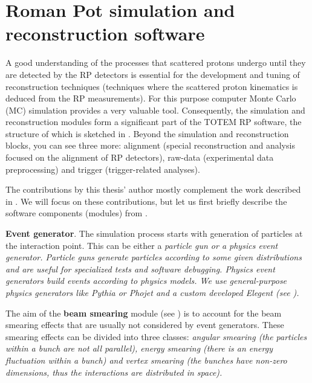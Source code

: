 \iffalse
RP, MC, IP5, CMS, T1, T2, VFAT, DIGI, RECO, LAB, LHC, LS, DPE, MC, TOTEM, RMS, ndf
\fi


\chapter[sr]{Roman Pot simulation and reconstruction software}



A good understanding of the processes that scattered protons undergo until they are detected by the RP detectors is essential for the development and tuning of reconstruction techniques (techniques where the scattered proton kinematics is deduced from the RP measurements). For this purpose computer Monte Carlo (MC) simulation provides a very valuable tool. Consequently, the simulation and reconstruction modules form a significant part of the TOTEM RP software, the structure of which is sketched in . Beyond the simulation and reconstruction blocks, you can see three more: alignment (special reconstruction and analysis focused on the alignment of RP detectors), raw-data (experimental data preprocessing) and trigger (trigger-related analyses).

The contributions by this thesis' author mostly complement the work described in . We will focus on these contributions, but let us first briefly describe the software components (modules) from .

\> {\bf Event generator}.
The simulation process starts with generation of particles at the interaction point. This can be either a \em{particle gun} or a \em{physics event generator}. Particle guns generate particles according to some given distributions and are useful for specialized tests and software debugging. Physics event generators build events according to physics models. We use general-purpose physics generators like Pythia  or Phojet  and a custom developed Elegent (see ).

\> The aim of the {\bf beam smearing} module (see ) is to account for the beam smearing effects that are usually not considered by event generators. These smearing effects can be divided into three classes: \em{angular smearing} (the particles within a bunch are not all parallel), \em{energy smearing} (there is an energy fluctuation within a bunch) and \em{vertex smearing} (the bunches have non-zero dimensions, thus the interactions are distributed in space). 

